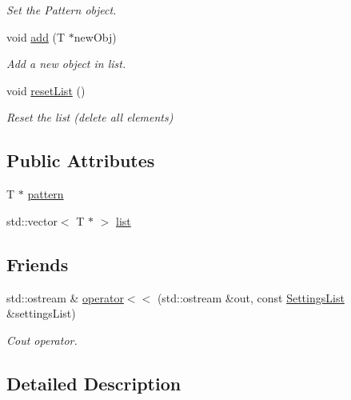 \begin{DoxyCompactItemize}
\begin{DoxyCompactList}\small\item\em Set the Pattern object. \end{DoxyCompactList}\item 
void \hyperlink{class_settings_list_a924dc826131b830aa9a51d6974edb35f}{add} (T $\ast$new\+Obj)
\begin{DoxyCompactList}\small\item\em Add a new object in list. \end{DoxyCompactList}\item 
\mbox{\label{class_settings_list_a2ec72ed5472832caff3e1f974cc94f8f}} 
void \hyperlink{class_settings_list_a2ec72ed5472832caff3e1f974cc94f8f}{reset\+List} ()
\begin{DoxyCompactList}\small\item\em Reset the list (delete all elements) \end{DoxyCompactList}\end{DoxyCompactItemize}
\subsection*{Public Attributes}
\begin{DoxyCompactItemize}
\item 
T $\ast$ \hyperlink{class_settings_list_a6e7e40cd0b7b54ceb0215916b0344609}{pattern}
\item 
std\+::vector$<$ T $\ast$ $>$ \hyperlink{class_settings_list_ad0c1155cd75a37372384c9adb8bfc748}{list}
\end{DoxyCompactItemize}
\subsection*{Friends}
\begin{DoxyCompactItemize}
\item 
std\+::ostream \& \hyperlink{class_settings_list_a7f03f8e5d27c4270224302acc75580ff}{operator$<$$<$} (std\+::ostream \&out, const \hyperlink{class_settings_list}{Settings\+List} \&settings\+List)
\begin{DoxyCompactList}\small\item\em Cout operator. \end{DoxyCompactList}\end{DoxyCompactItemize}


\subsection{Detailed Description}
